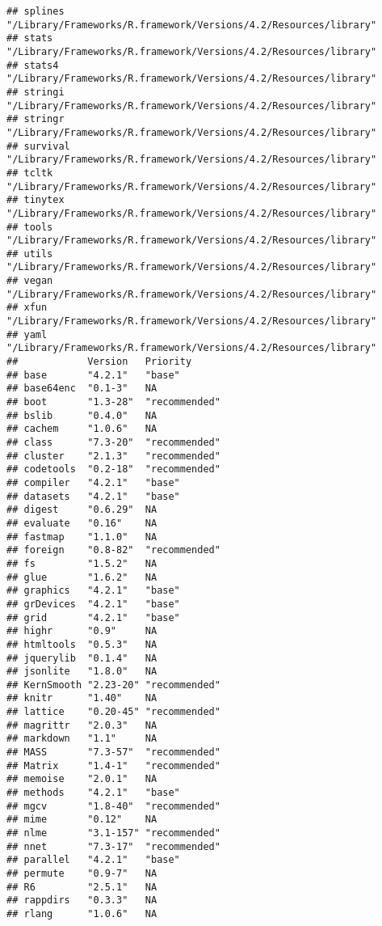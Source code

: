 \documentclass[
]{article}
\begin{document}
\begin{verbatim}
## splines    "/Library/Frameworks/R.framework/Versions/4.2/Resources/library"
## stats      "/Library/Frameworks/R.framework/Versions/4.2/Resources/library"
## stats4     "/Library/Frameworks/R.framework/Versions/4.2/Resources/library"
## stringi    "/Library/Frameworks/R.framework/Versions/4.2/Resources/library"
## stringr    "/Library/Frameworks/R.framework/Versions/4.2/Resources/library"
## survival   "/Library/Frameworks/R.framework/Versions/4.2/Resources/library"
## tcltk      "/Library/Frameworks/R.framework/Versions/4.2/Resources/library"
## tinytex    "/Library/Frameworks/R.framework/Versions/4.2/Resources/library"
## tools      "/Library/Frameworks/R.framework/Versions/4.2/Resources/library"
## utils      "/Library/Frameworks/R.framework/Versions/4.2/Resources/library"
## vegan      "/Library/Frameworks/R.framework/Versions/4.2/Resources/library"
## xfun       "/Library/Frameworks/R.framework/Versions/4.2/Resources/library"
## yaml       "/Library/Frameworks/R.framework/Versions/4.2/Resources/library"
##            Version   Priority     
## base       "4.2.1"   "base"       
## base64enc  "0.1-3"   NA           
## boot       "1.3-28"  "recommended"
## bslib      "0.4.0"   NA           
## cachem     "1.0.6"   NA           
## class      "7.3-20"  "recommended"
## cluster    "2.1.3"   "recommended"
## codetools  "0.2-18"  "recommended"
## compiler   "4.2.1"   "base"       
## datasets   "4.2.1"   "base"       
## digest     "0.6.29"  NA           
## evaluate   "0.16"    NA           
## fastmap    "1.1.0"   NA           
## foreign    "0.8-82"  "recommended"
## fs         "1.5.2"   NA           
## glue       "1.6.2"   NA           
## graphics   "4.2.1"   "base"       
## grDevices  "4.2.1"   "base"       
## grid       "4.2.1"   "base"       
## highr      "0.9"     NA           
## htmltools  "0.5.3"   NA           
## jquerylib  "0.1.4"   NA           
## jsonlite   "1.8.0"   NA           
## KernSmooth "2.23-20" "recommended"
## knitr      "1.40"    NA           
## lattice    "0.20-45" "recommended"
## magrittr   "2.0.3"   NA           
## markdown   "1.1"     NA           
## MASS       "7.3-57"  "recommended"
## Matrix     "1.4-1"   "recommended"
## memoise    "2.0.1"   NA           
## methods    "4.2.1"   "base"       
## mgcv       "1.8-40"  "recommended"
## mime       "0.12"    NA           
## nlme       "3.1-157" "recommended"
## nnet       "7.3-17"  "recommended"
## parallel   "4.2.1"   "base"       
## permute    "0.9-7"   NA           
## R6         "2.5.1"   NA           
## rappdirs   "0.3.3"   NA           
## rlang      "1.0.6"   NA           

\end{verbatim}
\end{document}
